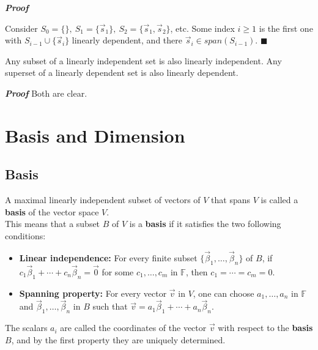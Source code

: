 \textbf{\textit{Proof}} 

Consider $S_0 = \{ \}, \ S_1 = \{\vec s_1 \}, \ S_2 = \{\vec s_1 , \vec s_2 \}$, etc. Some index $i \geq 1$ is the
first one with $S_{i−1} \cup \{\vec s_i \}$ linearly dependent, and there $\vec s_i \in \textit{span}(S_{i−1})$.
$\blacksquare$

\begin{lemma}
    Any subset of a linearly independent set is also linearly independent.
Any superset of a linearly dependent set is also linearly dependent.
\end{lemma}


\textbf{\textit{Proof}} Both are clear.

\section{Basis and Dimension}

\subsection{Basis}

A maximal linearly independent subset of vectors of $V$ that spans $V$ is called a \textbf{basis} of the vector space $V$.
\\

This means that a subset $B$ of $V$ is a \textbf{basis} if it satisfies the two following conditions:

\begin{itemize}
\item \textbf{Linear independence:}
    For every finite subset $\{ \vec{\beta} _{1},\dotsc ,\vec {\beta}_{n}\}$ of $B$, if ${\displaystyle c_{1}\vec {\beta}_{1} + \cdots + c_{n}\vec {\beta}_{n}=\vec {0} }$ for some ${\displaystyle c_{1},\dotsc ,c_{m}}$ in $\mathbb F$, then ${\displaystyle c_{1}=\cdots =c_{m}=0}$.
\item \textbf{Spanning property:}
    For every vector $\vec{v}$ in $V$, one can choose ${\displaystyle a_{1},\dots, a_{n}}$ in $\mathbb F$ and ${\displaystyle \vec {\beta}_{1},\dots  ,\vec {\beta}_{n}}$ in $B$ such that ${\displaystyle \vec {v} = a_{1}\vec {\beta}_{1} + \cdots + a_{n}\vec {\beta}_{n}}$.
\end{itemize}

The scalars $a_{i}$ are called the coordinates of the vector $\vec{v}$ with respect to the \textbf{basis} $B$, and by the first property they are uniquely determined.
\\


